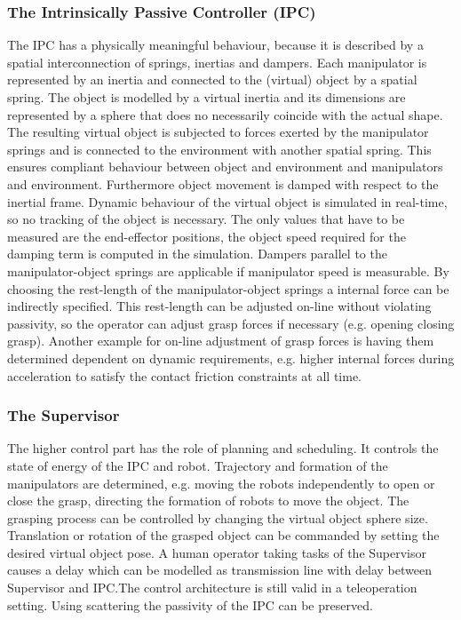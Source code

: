 \documentclass[a4paper,twoside, openright,12pt]{report}
\begin{document}
\subsubsection{The Intrinsically Passive Controller (IPC)}
The IPC has a physically meaningful behaviour, because it is described by a spatial interconnection of springs, inertias and dampers. Each manipulator is represented by an inertia and connected to the (virtual) object by a spatial spring. The object is modelled by a virtual inertia and its dimensions are represented by a sphere that does no necessarily coincide with the actual shape. The resulting virtual object is subjected to forces exerted by the manipulator springs and is connected to the environment with another spatial spring. This ensures compliant behaviour between object and environment and manipulators and environment. Furthermore object movement is damped with respect to the inertial frame. Dynamic behaviour of the virtual object is simulated in real-time, so no tracking of the object is necessary.  The only values that have to be measured are the end-effector positions, the object speed required for the damping term is computed in the simulation. Dampers parallel to the manipulator-object springs are applicable if manipulator speed is measurable.
By choosing the rest-length of the  manipulator-object springs a internal force can be indirectly specified. This rest-length can be adjusted on-line without violating passivity, so the operator can adjust grasp forces if necessary (e.g. opening closing grasp). Another example for on-line adjustment of grasp forces is having them determined dependent on dynamic requirements, e.g. higher internal forces during acceleration to satisfy the contact friction constraints at all time.
\subsubsection{The Supervisor}
The higher control part has the role of planning and scheduling. It controls the state of energy of the IPC and robot. Trajectory and formation of the manipulators are determined, e.g. moving the robots independently to open or close the grasp, directing the formation of robots to move the object. The grasping process can be controlled by changing the virtual object sphere size. Translation or rotation of the grasped object can be commanded by setting the desired virtual object pose. A human operator taking tasks of the Supervisor causes a delay which can be modelled as transmission line with delay between Supervisor and IPC.The control architecture is still valid in a teleoperation setting. Using scattering the passivity of the IPC can be preserved.  
\end{document}

